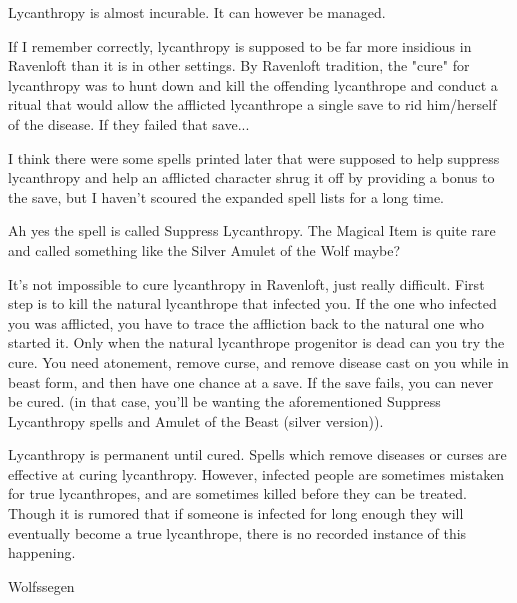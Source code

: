 \documentclass[a4paper]{dnd5}
\begin{document}
Lycanthropy is almost incurable.  It can however be managed.


If I remember correctly, lycanthropy is supposed to be far more insidious in Ravenloft than it is in other settings. By Ravenloft tradition, the "cure" for lycanthropy was to hunt down and kill the offending lycanthrope and conduct a ritual that would allow the afflicted lycanthrope a single save to rid him/herself of the disease. If they failed that save...

I think there were some spells printed later that were supposed to help suppress lycanthropy and help an afflicted character shrug it off by providing a bonus to the save, but I haven't scoured the expanded spell lists for a long time.

Ah yes the spell is called Suppress Lycanthropy. The Magical Item is quite rare and called something like the Silver Amulet of the Wolf maybe?

It's not impossible to cure lycanthropy in Ravenloft, just really difficult.  First step is to kill the natural lycanthrope that infected you. If the one who infected you was afflicted, you have to trace the affliction back to the natural one who started it. Only when the natural lycanthrope progenitor is dead can you try the cure. You need atonement, remove curse, and remove disease cast on you while in beast form, and then have one chance at a save. If the save fails, you can never be cured. (in that case, you'll be wanting the aforementioned Suppress Lycanthropy spells and Amulet of the Beast (silver version)).  

Lycanthropy is permanent until cured. Spells which remove diseases or curses are effective at curing lycanthropy. However, infected people are sometimes mistaken for true lycanthropes, and are sometimes killed before they can be treated. Though it is rumored that if someone is infected for long enough they will eventually become a true lycanthrope, there is no recorded instance of this happening.


Wolfssegen
\end{document}
